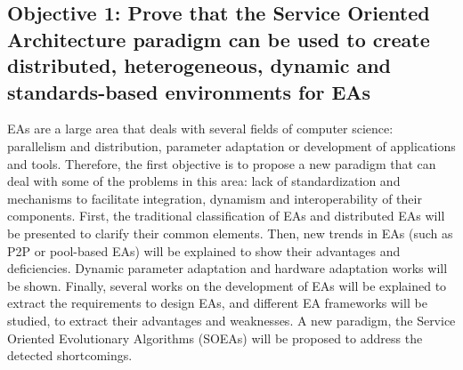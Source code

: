 \newcommand{\objectiveparadigm}{Prove that the Service Oriented Architecture paradigm can be used to create distributed, heterogeneous, dynamic and standards-based environments for EAs}


 \subsection*{Objective 1: \objectiveparadigm}
\label{subsec:intro:obj:problems}
EAs are a large area that deals with several fields of computer science: parallelism and distribution, parameter adaptation or development of applications and tools. Therefore, the first objective is to propose a new paradigm that can deal with some of the problems in this area: lack of standardization and mechanisms to facilitate integration, dynamism and interoperability of their components. First, the traditional classification of EAs and distributed EAs will be presented to clarify their common elements. Then, new trends in EAs (such as P2P or pool-based EAs) will be explained to show their advantages and deficiencies. Dynamic parameter adaptation and hardware adaptation works will be shown. Finally, several works on the development of EAs will be explained to extract the requirements to design EAs, and different EA frameworks will be studied, to extract their advantages and weaknesses. A new paradigm, the Service Oriented Evolutionary Algorithms (SOEAs) will be proposed to address the detected shortcomings.

